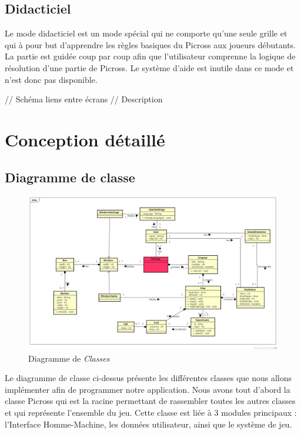 \documentclass{report}
\begin{document}
	\section{Didacticiel}
	
	Le mode didacticiel est un mode spécial qui ne comporte qu'une seule grille et qui à pour but d'apprendre les règles basiques du Picross aux joueurs débutants. La partie est guidée coup par coup afin que l'utilisateur comprenne la logique de résolution d'une partie de Picross. Le système d'aide  est inutile dans ce mode et n'est  donc pas disponible.
	
	// Schéma liens entre écrans
	// Description
			
\chapter{Conception détaillé}

    \section{Diagramme de classe}
    
    \begin{figure}[H]
	\caption{Diagramme de \textit{Classes}}
	\includegraphics[width=17cm]{../UML/Class_Diagram/DiagrammeClasse.png}
    \end{figure}
    
    	
	Le diagramme de classe ci-dessus présente les différentes classes que nous allons implémenter afin de programmer notre application. Nous avons tout d’abord la classe Picross qui est la racine permettant de rassembler toutes les autres classes et qui représente l’ensemble du jeu. Cette classe est liée à 3 modules principaux : l’Interface Homme-Machine, les données utilisateur, ainsi que le système de jeu.
\end{document}

